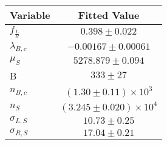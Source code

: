 \begin{tabular}[t]{lc}
\hline
Variable &Fitted Value\\
\hline\hline
$f_{\frac{L}{R}}$&$0.398\pm0.022$\\
\hline
$\lambda_{B,c}$&$-0.00167\pm0.00061$\\
\hline
$\mu_S$&$5278.879\pm0.094$\\
\hline
B&$333\pm27$\\
\hline
$n_{B,c}$&$(1.30\pm0.11)\times 10^3$\\
\hline
$n_S$&$(3.245\pm0.020)\times 10^4$\\
\hline
$\sigma_{L, S}$&$10.73\pm0.25$\\
\hline
$\sigma_{R, S}$&$17.04\pm0.21$\\
\hline
\end{tabular}